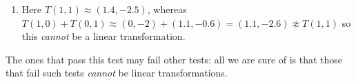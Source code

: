 \begin{example}
\begin{enumerate}[ref=\ref{eg:ltHiD}(\alph*)]
\begin{solution}
\begin{enumerate}
\item Here \(T(1,1)\approx(1.4,-2.5)\), whereas
\(T(1,0)+T(0,1)\approx (0,-2)+(1.1,-0.6)
=(1.1,-2.6)\not\approx T(1,1)\) 
so this \emph{cannot} be a linear transformation.
\end{enumerate} 
The ones that pass this test may fail other tests: all we are sure of is that those that fail such tests \emph{cannot} be linear transformations.
\end{solution}


\end{enumerate}
\end{example}
